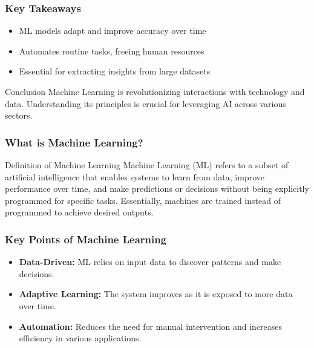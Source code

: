 \documentclass[aspectratio=169]{beamer}
\begin{document}
\begin{frame}[fragile]
    \frametitle{Key Takeaways}
    \begin{itemize}
        \item ML models adapt and improve accuracy over time
        \item Automates routine tasks, freeing human resources
        \item Essential for extracting insights from large datasets
    \end{itemize}
    
    \begin{block}{Conclusion}
        Machine Learning is revolutionizing interactions with technology and data. Understanding its principles is crucial for leveraging AI across various sectors.
    \end{block}
\end{frame}

\begin{frame}[fragile]
    \frametitle{What is Machine Learning?}
    \begin{block}{Definition of Machine Learning}
        Machine Learning (ML) refers to a subset of artificial intelligence that enables systems to learn from data, improve performance over time, and make predictions or decisions without being explicitly programmed for specific tasks. Essentially, machines are trained instead of programmed to achieve desired outputs.
    \end{block}
\end{frame}

\begin{frame}[fragile]
    \frametitle{Key Points of Machine Learning}
    \begin{itemize}
        \item \textbf{Data-Driven:} ML relies on input data to discover patterns and make decisions. 
        \item \textbf{Adaptive Learning:} The system improves as it is exposed to more data over time. 
        \item \textbf{Automation:} Reduces the need for manual intervention and increases efficiency in various applications.
    \end{itemize}
\end{frame}
\end{document}
